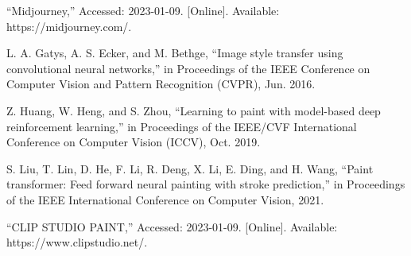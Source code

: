 \documentclass[MIRU,submit,uplatex]{miru2023j}
\begin{document}



\begin{thebibliography}{9}%
“Midjourney,” Accessed: 2023-01-09. [Online]. Available: https://midjourney.com/.

L. A. Gatys, A. S. Ecker, and M. Bethge, “Image style transfer using
convolutional neural networks,” in Proceedings of the IEEE Conference
on Computer Vision and Pattern Recognition (CVPR), Jun. 2016.

Z. Huang, W. Heng, and S. Zhou, “Learning to paint with model-based
deep reinforcement learning,” in Proceedings of the IEEE/CVF International 
Conference on Computer Vision (ICCV), Oct. 2019.

S. Liu, T. Lin, D. He, F. Li, R. Deng, X. Li, E. Ding, and H. Wang,
“Paint transformer: Feed forward neural painting with stroke prediction,”
in Proceedings of the IEEE International Conference on Computer Vision, 2021.

“CLIP STUDIO PAINT,” Accessed: 2023-01-09. [Online]. Available: https://www.clipstudio.net/.


\end{thebibliography}
\end{document}
